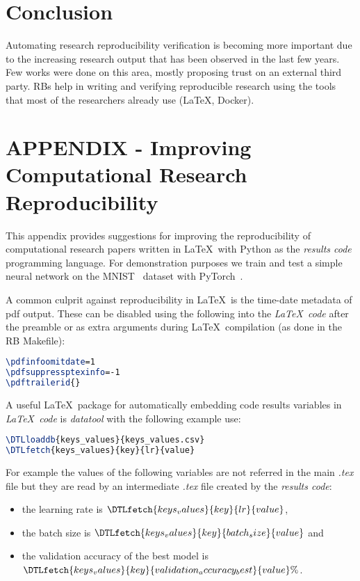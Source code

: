 \documentclass[journal]{IEEEtran}
\begin{document}
\section{Conclusion}
Automating research reproducibility verification is becoming more important due to the increasing research output that has been observed in the last few years.
Few works were done on this area, mostly proposing trust on an external third party.
RBs help in writing and verifying reproducible research using the tools that most of the researchers already use (\LaTeX, Docker).

\section{APPENDIX - Improving Computational Research Reproducibility}
This appendix provides suggestions for improving the reproducibility of computational research papers written in \LaTeX\ with Python as the \textit{results code} programming language.
For demonstration purposes we train and test a simple neural network on the MNIST~\cite{lecun2010mnist} dataset with PyTorch~\cite{paszke2019pytorch}.

A common culprit against reproducibility in \LaTeX\ is the time-date metadata of pdf output.
These can be disabled using the following into the \textit{\LaTeX\ code} after the preamble or as extra arguments during \LaTeX\ compilation (as done in the RB Makefile):
\begin{lstlisting}[language=TeX, style=lststyle, caption={\LaTeX\ pdf reproducibility commands.}, captionpos=b]
\pdfinfoomitdate=1
\pdfsuppressptexinfo=-1
\pdftrailerid{}
\end{lstlisting}

A useful \LaTeX\ package for automatically embedding code results variables in \textit{\LaTeX\ code} is \textit{datatool} with the following example use:
\begin{lstlisting}[language=TeX, style=lststyle, caption={\LaTeX\ datatool example of loading a file that contains pairs of keys and values (keys\_values.csv) generated by a \textit{results code} and getting the value of a key named lr.}, captionpos=b]
\DTLloaddb{keys_values}{keys_values.csv}
\DTLfetch{keys_values}{key}{lr}{value}
\end{lstlisting}

For example the values of the following variables are not referred in the main \textit{.tex} file but they are read by an intermediate \textit{.tex} file created by the \textit{results code}:
\begin{itemize}
	\item the learning rate is $\DTLfetch{keys_values}{key}{lr}{value}$,
	\item the batch size is $\DTLfetch{keys_values}{key}{batch_size}{value}$ and
	\item the validation accuracy of the best model is $\DTLfetch{keys_values}{key}{validation_accuracy_best}{value}\%$.
\end{itemize}
\end{document}
